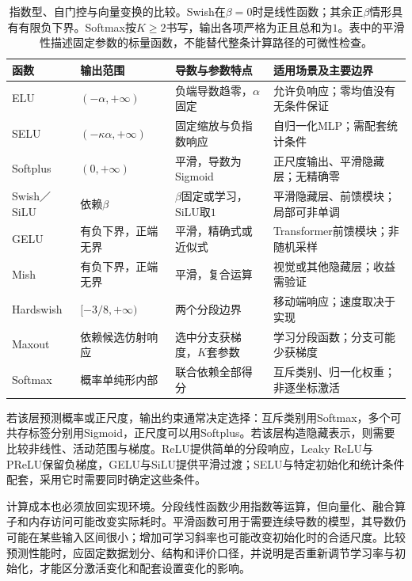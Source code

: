 \begin{table}[htb]
  \centering
  \small
  \begin{tabularx}{\linewidth}{@{}l l X X@{}}
    \toprule
    函数 & 输出范围 & 导数与参数特点 & 适用场景及主要边界 \\
    \midrule
    ELU & $(-\alpha,+\infty)$ & 负端导数趋零，$\alpha$固定 & 允许负响应；零均值没有无条件保证 \\
    SELU & $(-\kappa\alpha,+\infty)$ & 固定缩放与负指数响应 & 自归一化MLP；需配套统计条件 \\
    Softplus & $(0,+\infty)$ & 平滑，导数为Sigmoid & 正尺度输出、平滑隐藏层；无精确零 \\
    Swish／SiLU & 依赖$\beta$ & $\beta$固定或学习，SiLU取$1$ & 平滑隐藏层、前馈模块；局部可非单调 \\
    GELU & 有负下界，正端无界 & 平滑，精确式或近似式 & Transformer前馈模块；非随机采样 \\
    Mish & 有负下界，正端无界 & 平滑，复合运算 & 视觉或其他隐藏层；收益需验证 \\
    Hardswish & $[-3/8,+\infty)$ & 两个分段边界 & 移动端响应；速度取决于实现 \\
    Maxout & 依赖候选仿射响应 & 选中分支获梯度，$K$套参数 & 学习分段函数；分支可能少获梯度 \\
    Softmax & 概率单纯形内部 & 联合依赖全部得分 & 互斥类别、归一化权重；非逐坐标激活 \\
    \bottomrule
  \end{tabularx}
  \caption{指数型、自门控与向量变换的比较。Swish在$\beta=0$时是线性函数；其余正$\beta$情形具有有限负下界。Softmax按$K\geq2$书写，输出各项严格为正且总和为$1$。表中的平滑性描述固定参数的标量函数，不能替代整条计算路径的可微性检查。}
  \label{tab:ffn-activation-smooth}
\end{table}

若该层预测概率或正尺度，输出约束通常决定选择：互斥类别用Softmax，多个可共存标签分别用Sigmoid，正尺度可以用Softplus。若该层构造隐藏表示，则需要比较非线性、活动范围与梯度。ReLU提供简单的分段响应，Leaky ReLU与PReLU保留负梯度，GELU与SiLU提供平滑过渡；SELU与特定初始化和统计条件配套，采用它时需要同时确定这些条件。

计算成本也必须放回实现环境。分段线性函数少用指数等运算，但向量化、融合算子和内存访问可能改变实际耗时。平滑函数可用于需要连续导数的模型，其导数仍可能在某些输入区间很小；增加可学习斜率也可能改变初始化时的合适尺度。比较预测性能时，应固定数据划分、结构和评价口径，并说明是否重新调节学习率与初始化，才能区分激活变化和配套设置变化的影响。

